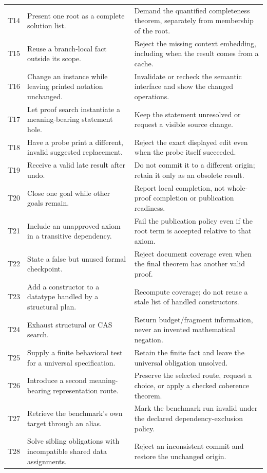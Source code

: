 \documentclass[11pt,letterpaper]{article}
\theoremstyle{definition}
\theoremstyle{remark}
\begin{document}
\begin{longtable}{@{}P{.06\textwidth}P{.41\textwidth}P{.45\textwidth}@{}}
T14 & Present one root as a complete solution list. & Demand the quantified
completeness theorem, separately from membership of the root.\\
T15 & Reuse a branch-local fact outside its scope. & Reject the missing context
embedding, including when the result comes from a cache.\\
T16 & Change an instance while leaving printed notation unchanged. & Invalidate
or recheck the semantic interface and show the changed operations.\\
T17 & Let proof search instantiate a meaning-bearing statement hole. & Keep the
statement unresolved or request a visible source change.\\
T18 & Have a probe print a different, invalid suggested replacement. & Reject the
exact displayed edit even when the probe itself succeeded.\\
T19 & Receive a valid late result after undo. & Do not commit it to a different
origin; retain it only as an obsolete result.\\
T20 & Close one goal while other goals remain. & Report local completion, not
whole-proof completion or publication readiness.\\
T21 & Include an unapproved axiom in a transitive dependency. & Fail the publication
policy even if the root term is accepted relative to that axiom.\\
T22 & State a false but unused formal checkpoint. & Reject document coverage even
when the final theorem has another valid proof.\\
T23 & Add a constructor to a datatype handled by a structural plan. & Recompute
coverage; do not reuse a stale list of handled constructors.\\
T24 & Exhaust structural or CAS search. & Return budget/fragment information,
never an invented mathematical negation.\\
T25 & Supply a finite behavioral test for a universal specification. & Retain the
finite fact and leave the universal obligation unsolved.\\
T26 & Introduce a second meaning-bearing representation route. & Preserve the
selected route, request a choice, or apply a checked coherence theorem.\\
T27 & Retrieve the benchmark's own target through an alias. & Mark the benchmark
run invalid under the declared dependency-exclusion policy.\\
T28 & Solve sibling obligations with incompatible shared data assignments. &
Reject an inconsistent commit and restore the unchanged origin.\\
\bottomrule
\end{longtable}
\normalsize
\end{document}
